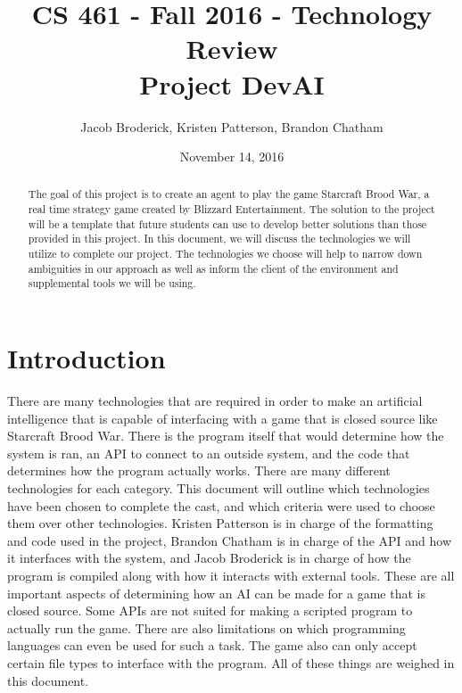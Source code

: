 \begin{titlepage}

  \title{CS 461 - Fall 2016 - Technology Review \\ Project DevAI}
  \author{Jacob Broderick, Kristen Patterson, Brandon Chatham}
  \date{November 14, 2016}
  \maketitle
  \vspace{4cm}
  \begin{abstract}
  	\noindent 
  	  	\noindent
	The goal of this project is to create an agent to play the game Starcraft Brood War, a real time strategy game created by Blizzard Entertainment. The solution to the project will be a template that future students can use to develop better solutions than those provided in this project. In this document, we will discuss the technologies we will utilize to complete our project. The technologies we choose will help to narrow down ambiguities in our approach as well as inform the client of the environment and supplemental tools we will be using.
   \end{abstract}
\end{titlepage}

\tableofcontents

\newpage

\section{Introduction}
There are many technologies that are required in order to make an artificial intelligence that is capable of interfacing with a game that is closed source like Starcraft Brood War. There is the program itself that would determine how the system is ran, an API to connect to an outside system, and the code that determines how the program actually works. There are many different technologies for each category. This document will outline which technologies have been chosen to complete the cast, and which criteria were used to choose them over other technologies. Kristen Patterson is in charge of the formatting and code used in the project, Brandon Chatham is in charge of the API and how it interfaces with the system, and Jacob Broderick is in charge of how the program is compiled along with how it interacts with external tools. These are all important aspects of determining how an AI can be made for a game that is closed source. Some APIs are not suited for making a scripted program to actually run the game. There are also limitations on which programming languages can even be used for such a task. The game also can only accept certain file types to interface with the program. All of these things are weighed in this document.
